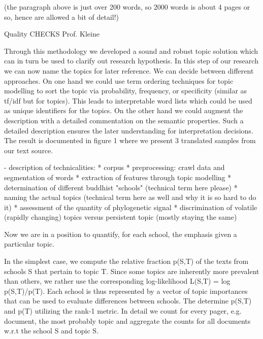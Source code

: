\documentclass[a4paper,10pt]{article}
\newcommand{\TODO}[1]{\begingroup\color{red}#1\endgroup}
\begin{document}
  \TODO{(the paragraph above is just over 200 words, so 2000 words is about
    4 pages or so, hence are allowed a bit of detail!)}







Quality CHECKS Prof. Kleine

Through this methodology we developed a sound and robust topic solution which can in turn
be used to clarify out research hypothesis. In this step of our research we can now name
the topics for later reference. We can decide between different approaches. On one hand 
we could use term ordering techniques for topic modelling to sort the topic via 
probability, frequency, or specificity (similar as tf/idf but for topics). This leads to 
interpretable word lists which could be used as unique identifiers for the topics. On
the other hand we could augment the description with a detailed commentation on the 
semantic properties. Such a detailed description ensures the later understanding for 
interpretation decisions. The result is documented in figure 1 where we present 3 
translated samples from our text source.

- description of technicalities:
  * corpus
  * preprocessing: crawl data and segmentation of words
  * extraction of features through topic modelling
  * determination of different buddhist "schools" (technical term here please)
  * naming the actual topics (technical term here as well and why it is so hard to do it)
  * assessment of the quantity of phylogenetic signal
  * discrimination of volatile (rapidly changing) topics versus persistent topic 
  (mostly staying the same) 


Now we are in a position to quantify, for each school, the emphasis given a particular 
topic. 


In the simplest case, we compute the relative fraction p(S,T) of the texts from schools S 
that pertain to topic T. Since some topics are inherently more prevalent than others, we 
rather use the corresponding log-likelihood L(S,T) = log p(S,T)/p(T). Each school is thus
represented by a vector of topic importances that can be used to evaluate differences 
between schools. The determine p(S,T) and p(T) utilizing the rank-1 metric. In detail we 
count for every pager, e.g. document, the most probably topic and aggregate the counts 
for all documents w.r.t the school S and topic S. 
\end{document}
